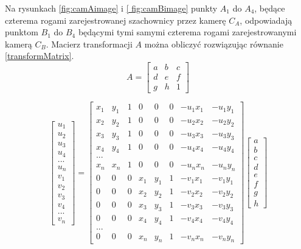 Na rysunkach \ref{fig:camAimage} i \ref{ fig:camBimage} punkty $A_1$ do $A_4$, będące czterema rogami zarejestrowanej szachownicy przez kamerę $C_A$, odpowiadają punktom $B_1$ do $B_4$ będącymi tymi samymi czterema rogami zarejestrowanymi kamerą $C_B$. Macierz transformacji $A$ można obliczyć rozwiązując równanie \eqref{transformMatrix}.
\begin{equation}
\label{transformMatrix}
A = \begin{bmatrix}
a & b & c\\ 
d & e & f\\ 
g & h & 1
\end{bmatrix}
\end{equation}

\begin{equation}
\begin{bmatrix}
u_1\\ 
u_2\\ 
u_3\\ 
u_4\\
...\\ 
u_n\\ 
v_1\\ 
v_2\\ 
v_3\\ 
v_4\\ 
...\\ 
v_n 

\end{bmatrix}
=
\begin{bmatrix}
x_1 & y_1 & 1 & 0 & 0 & 0 & -u_1x_1 & -u_1y_1\\ 
x_2 & y_2 & 1 & 0 & 0 & 0 & -u_2x_2 & -u_2y_2\\ 
x_3 & y_3 & 1 & 0 & 0 & 0 & -u_3x_3 & -u_3y_3\\ 
x_4 & y_4 & 1 & 0 & 0 & 0 & -u_4x_4 & -u_4y_4\\ 
...\\ 
x_n & x_n & 1 & 0 & 0 & 0 & -u_nx_n & -u_ny_n\\ 
0 & 0 & 0 & x_1 & y_1 & 1 & -v_1x_1 & -v_1y_1\\ 
0 & 0 & 0 & x_2 & y_2 & 1 & -v_2x_2 & -v_2y_2\\  
0 & 0 & 0 & x_3 & y_3 & 1 & -v_3x_3 & -v_3y_3\\ 
0 & 0 & 0 & x_4 & y_4 & 1 & -v_4x_4 & -v_4y_4\\ 
...\\ 
0 & 0 & 0 & x_n & y_n & 1 & -v_nx_n & -v_ny_n
\end{bmatrix}
\begin{bmatrix}
a \\
b\\
c\\
d \\
e\\
f\\
g\\
h
\end{bmatrix}
\end{equation}

